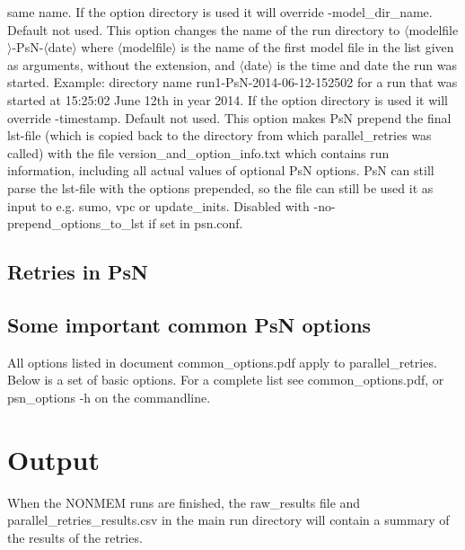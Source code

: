 \begin{optionlist}
same name. If the option directory is used it will override -model\_dir\_name.
\nextopt
{}
Default not used. This option changes the name of the run directory to $\langle$modelfile$\rangle$-PsN-$\langle$date$\rangle$
where $\langle$modelfile$\rangle$ is the name of the first model file in the list given as arguments, without the extension,
and $\langle$date$\rangle$ is the time and date the run was started. 
Example: directory name run1-PsN-2014-06-12-152502 for a run that was started at 15:25:02 June 12th in year 2014.
If the option directory is used it will override -timestamp.
\nextopt
{}
Default not used. This option makes PsN prepend the final lst-file (which is copied back to the directory from which parallel\_retries was called) with the file version\_and\_option\_info.txt which contains run information, including     all actual values of optional PsN options. PsN can still parse the lst-file with the options prepended, so the file can still be used it as input to e.g. sumo, vpc or update\_inits. Disabled with -no-prepend\_options\_to\_lst if set in psn.conf.
\nextopt
\end{optionlist}

\subsection{Retries in PsN}


\subsection{Some important common PsN options}
All options listed in document common\_options.pdf apply to parallel\_retries. 
Below is a set of basic options. For a complete list see common\_options.pdf, 
or psn\_options -h on the commandline.


\section{Output}
When the NONMEM runs are finished, the raw\_results file 
and parallel\_retries\_results.csv
in the
main run directory will contain a summary of the results of the 
retries.


